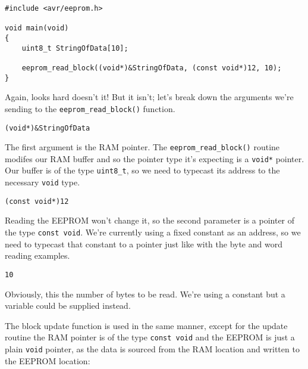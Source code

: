 \documentclass[a4paper,oneside,notitlepage]{book}
\begin{document}
\begin{center}
\begin{lstlisting}
#include <avr/eeprom.h>

void main(void)
{
    uint8_t StringOfData[10];

    eeprom_read_block((void*)&StringOfData, (const void*)12, 10);
}
\end{lstlisting}
\end{center}

Again, looks hard doesn't it! But it isn't; let's break down the arguments we're sending to the \lstinline{eeprom_read_block()} function.

\begin{center}
\begin{lstlisting}
(void*)&StringOfData
\end{lstlisting}
\end{center}

The first argument is the RAM pointer. The \lstinline{eeprom_read_block()} routine modifes our RAM buffer and so the pointer type it's expecting is a \lstinline{void*} pointer. Our buffer is of the type \lstinline{uint8_t}, so we need to typecast its address to the necessary \lstinline{void} type.

\begin{center}
\begin{lstlisting}
(const void*)12
\end{lstlisting}
\end{center}

Reading the EEPROM won't change it, so the second parameter is a pointer of the type \lstinline{const void}. We're currently using a fixed constant as an address, so we need to typecast that constant to a pointer just like with the byte and word reading examples.

\begin{center}
\begin{lstlisting}
10
\end{lstlisting}
\end{center}

Obviously, this the number of bytes to be read. We're using a constant but a variable could be supplied instead.

The block update function is used in the same manner, except for the update routine the RAM pointer is of the type \lstinline{const void} and the EEPROM is just a plain \lstinline{void} pointer, as the data is sourced from the RAM location and written to the EEPROM location:
\end{document}

